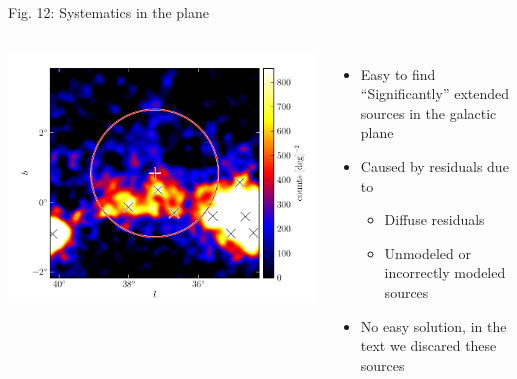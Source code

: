 \documentclass[12pt]{beamer}
\begin{document}
\begin{frame}{Fig. 12: Systematics in the plane}
  \begin{columns}
  \includegraphics[scale=0.5]{plots/example_bad_fit_color.pdf}
    \begin{itemize}
    \item Easy to find ``Significantly'' extended sources
    in the galactic plane
    \item Caused by residuals due to
    \begin{itemize}
    \item Diffuse residuals
    \item Unmodeled or incorrectly modeled sources
    \end{itemize}
    \item No easy solution, in the text we discared these sources
      \end{itemize}
  \end{columns}
\end{frame}
\end{document}
